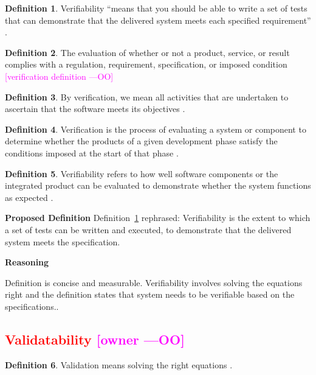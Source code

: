 \documentclass[letterpaper,cleveref]{lipics-v2019}
\newcommand{\authornote}[3]{\textcolor{#1}{[#3 ---#2]}}
\newcommand{\authornote}[3]{}
\newcommand{\oo}[1]{\authornote{magenta}{OO}{#1}} %
\newcommand{\notdone}[1]{\textcolor{red}{#1}}
\theoremstyle{definition}
\newtheorem{defn}{Definition}
\begin{document}
\begin{defn} \label{Defn_Verifiability1}
Verifiability ``means that you should be able to write a set of tests that can
demonstrate that the delivered system meets each specified requirement'' \citep{sommerville}.	
\end{defn}

\begin{defn}
	The evaluation of whether or not a product, service, or result complies with
	a regulation, requirement, specification, or imposed condition \citep{project2017guide}
	\oo {verification definition}
\end{defn}

\begin{defn}
	By verification, we mean all activities that are undertaken to ascertain that the
	software meets its objectives \citep{GhezziEtAl2003}.
\end{defn}

\begin{defn}
	 Verification is the process of evaluating a system or component to determine whether the products
	 of a given development phase satisfy the conditions imposed at the start of that phase \citep{IEEEStdGlossarySET1990}.
\end{defn}

\begin{defn}
	Verifiability refers to how well software components or the integrated
	product can be evaluated to demonstrate whether the system functions as
	expected \citep{wiegers2003softreq}.
\end{defn}
\noindent \textbf{Proposed Definition}
Definition~\ref{Defn_Verifiability1} rephrased:
Verifiability is the extent to which a set of tests can be written and executed, to demonstrate
that the delivered system meets the specification.

\noindent \textbf{Reasoning} 

Definition is concise and measurable.  Verifiability involves solving the
equations right \citep[p.~23]{Roache1998} and the definition states that system needs to be verifiable based on the specifications..

\subsection{\notdone{Validatability} \oo{owner}}

\begin{defn}
  Validation means solving the right equations \citep[p.~23]{Roache1998}.
\end{defn}
\end{document}
